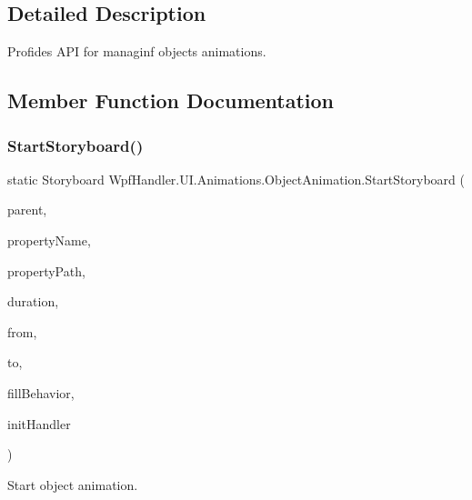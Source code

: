 \subsection{Detailed Description}
Profides A\+PI for managinf objects animations. 



\subsection{Member Function Documentation}
\mbox{\label{class_wpf_handler_1_1_u_i_1_1_animations_1_1_object_animation_ac96433e1be9908688f99df2ce31522cb}} 
\subsubsection{\texorpdfstring{Start\+Storyboard()}{StartStoryboard()}\hspace{0.1cm}{\footnotesize\ttfamily [1/3]}}
{\footnotesize\ttfamily static Storyboard Wpf\+Handler.\+U\+I.\+Animations.\+Object\+Animation.\+Start\+Storyboard (\begin{DoxyParamCaption}\item[{Framework\+Element}]{parent,  }\item[{string}]{property\+Name,  }\item[{Property\+Path}]{property\+Path,  }\item[{Time\+Span}]{duration,  }\item[{object}]{from,  }\item[{object}]{to,  }\item[{Fill\+Behavior}]{fill\+Behavior,  }\item[{Action$<$ Storyboard $>$}]{init\+Handler }\end{DoxyParamCaption})\hspace{0.3cm}{\ttfamily [static]}}



Start object animation. 


